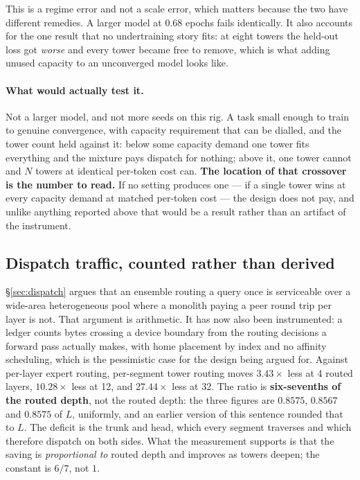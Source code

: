 \documentclass[11pt]{article}
\begin{document}
This is a regime error and not a scale error, which matters because the two have different remedies. A larger model at $0.68$ epochs fails identically. It also accounts for the one result that no undertraining story fits: at eight towers the held-out loss got \emph{worse} and every tower became free to remove, which is what adding unused capacity to an unconverged model looks like.

\paragraph{What would actually test it.} Not a larger model, and not more seeds on this rig. A task small enough to train to genuine convergence, with capacity requirement that can be dialled, and the tower count held against it: below some capacity demand one tower fits everything and the mixture pays dispatch for nothing; above it, one tower cannot and $N$ towers at identical per-token cost can. \textbf{The location of that crossover is the number to read.} If no setting produces one --- if a single tower wins at every capacity demand at matched per-token cost --- the design does not pay, and unlike anything reported above that would be a result rather than an artifact of the instrument.

\subsection{Dispatch traffic, counted rather than derived}
\label{sec:commsrun}

\S\ref{sec:dispatch} argues that an ensemble routing a query once is serviceable over a wide-area heterogeneous pool where a monolith paying a peer round trip per layer is not. That argument is arithmetic. It has now also been instrumented: a ledger counts bytes crossing a device boundary from the routing decisions a forward pass actually makes, with home placement by index and no affinity scheduling, which is the pessimistic case for the design being argued for. Against per-layer expert routing, per-segment tower routing moves $3.43\times$ less at 4 routed layers, $10.28\times$ less at 12, and $27.44\times$ less at 32. The ratio is \textbf{six-sevenths of the routed depth}, not the routed depth: the three figures are $0.8575$, $0.8567$ and $0.8575$ of $L$, uniformly, and an earlier version of this sentence rounded that to $L$. The deficit is the trunk and head, which every segment traverses and which therefore dispatch on both sides. What the measurement supports is that the saving is \emph{proportional to} routed depth and improves as towers deepen; the constant is $6/7$, not $1$.
\end{document}
